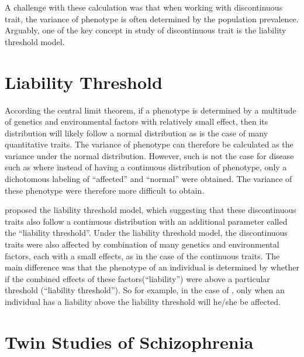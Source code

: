 \documentclass{book}
\newcommand*{\glng}{\glsentrylong}
\begin{document}
	A challenge with these calculation was that when working with discontinuous trait, the variance of phenotype is often determined by the population prevalence.
	Arguably, one of the key concept in study of discontinuous trait is the liability threshold model.
	
	\section{Liability Threshold}
	According the central limit theorem, if a phenotype is determined by a multitude of genetics and environmental factors with relatively small effect, then its distribution will likely follow a normal distribution as is the case of many quantitative traits\citep{Visscher2008}. %
	The variance of phenotype can therefore be calculated as the variance under the normal distribution.
	However, such is not the case for disease such as \glng{scz} where instead of having a continuous distribution of phenotype, only a dichotomous labeling of ``affected'' and ``normal'' were obtained.
	The variance of these phenotype were therefore more difficult to obtain.
	
	\citet{Falconer1965} proposed the liability threshold model, which suggesting that these discontinuous traits also follow a continuous distribution with an additional parameter called the ``liability threshold''.
	Under the liability threshold model, the discontinuous traits were also affected by combination of many genetics and environmental factors, each with a small effects, as in the case of the continuous traits.
	The main difference was that the phenotype of an individual is determined by whether if the combined effects of these factors(``liability'') were above a particular threshold (``liability threshold'').
	So for example, in the case of \glng{scz}, only when an individual has a liability above the liability threshold will he/she be affected.
	
	
	
	
	\section{Twin Studies of Schizophrenia}
	\sectionmark{Twin Studies of \glng{scz}}
	
\end{document}
